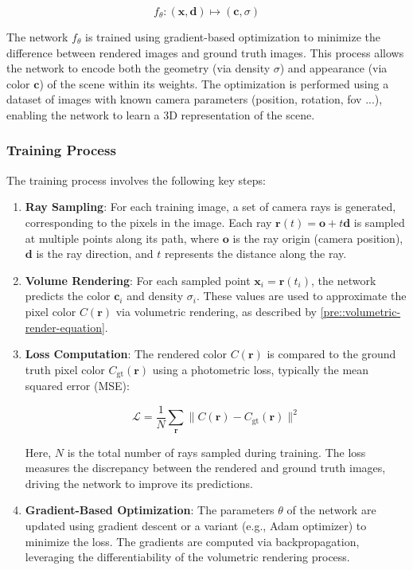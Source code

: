 \begin{equation}
 f_\theta : (\mathbf{x}, \mathbf{d}) \mapsto (\mathbf{c}, \sigma)
\end{equation}

The network \( f_\theta \) is trained using gradient-based optimization to minimize the difference between rendered images and ground truth images. This process allows the network to encode both the geometry (via density \( \sigma \)) and appearance (via color \( \mathbf{c} \)) of the scene within its weights. The optimization is performed using a dataset of images with known camera parameters (position, rotation, fov ...), enabling the network to learn a 3D representation of the scene.

\subsubsection*{Training Process}
The training process involves the following key steps:

\begin{enumerate}
    \item \textbf{Ray Sampling}: For each training image, a set of camera rays is generated, corresponding to the pixels in the image. Each ray \( \mathbf{r}(t) = \mathbf{o} + t\mathbf{d} \) is sampled at multiple points along its path, where \( \mathbf{o} \) is the ray origin (camera position), \( \mathbf{d} \) is the ray direction, and \( t \) represents the distance along the ray.

    \item \textbf{Volume Rendering}: For each sampled point \( \mathbf{x}_i = \mathbf{r}(t_i) \), the network predicts the color \( \mathbf{c}_i \) and density \( \sigma_i \). These values are used to approximate the pixel color \( C(\mathbf{r}) \) via volumetric rendering, as described by \ref{pre::volumetric-render-equation}.

    \item \textbf{Loss Computation}: The rendered color \( C(\mathbf{r}) \) is compared to the ground truth pixel color \( C_{\text{gt}}(\mathbf{r}) \) using a photometric loss, typically the mean squared error (MSE):

\begin{equation}
 \mathcal{L} = \frac{1}{N} \sum_{\mathbf{r}} \| C(\mathbf{r}) - C_{\text{gt}}(\mathbf{r}) \|^2
\end{equation}

Here, \( N \) is the total number of rays sampled during training. The loss measures the discrepancy between the rendered and ground truth images, driving the network to improve its predictions.

    \item \textbf{Gradient-Based Optimization}: The parameters \( \theta \) of the network are updated using gradient descent or a variant (e.g., Adam optimizer) to minimize the loss. The gradients are computed via backpropagation, leveraging the differentiability of the volumetric rendering process.
\end{enumerate}

